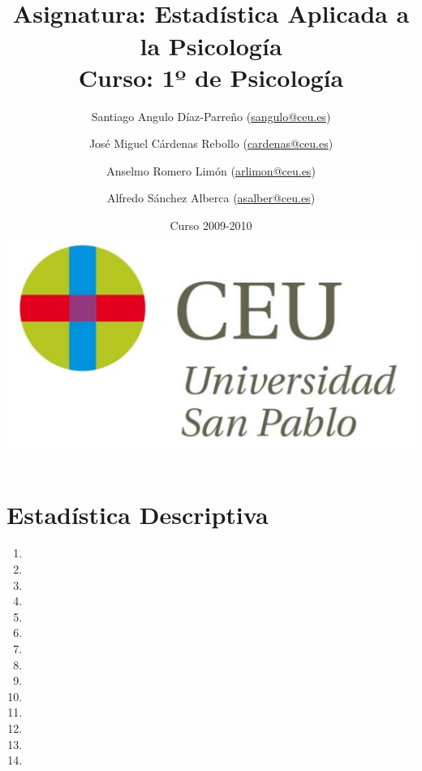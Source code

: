 \documentclass[a4paper,titlepage]{article}
\begin{document}
\sloppy

\title{\vskip 2cm
\shadowbox{\Huge \textbf{\textsf{\quad \textcolor[rgb]{0.00,0.00,0.50}{EJERCICIOS DE ESTADÍSTICA}\quad}}}\\
   \vskip 1cm
   {\Large \textsf{\textcolor[rgb]{0.50,0.00,0.25}{Asignatura: Estadística Aplicada a la Psicología }}}\\
   {\Large \textsf{\textcolor[rgb]{0.50,0.00,0.25}{Curso: 1º de Psicología}}}
   }
\author{
   Santiago Angulo Díaz-Parreño (\url{sangulo@ceu.es})
   \and
   José Miguel Cárdenas Rebollo (\url{cardenas@ceu.es})
   \and
   Anselmo Romero Limón (\url{arlimon@ceu.es})
   \and
   Alfredo Sánchez Alberca (\url{asalber@ceu.es})
}
\date{Curso 2009-2010\\[1cm]
\includegraphics[scale=0.3]{img/logo_uspceu_01}}

\maketitle
\newpage
\tableofcontents
\newpage









\section{Estadística Descriptiva}
\begin{enumerate}[leftmargin=*]
\item {}
\item {}
\item {}
\item {}
\item {}
\item {}
\item {}
\item {}
\item {}
\item {}
\item {}
\item {}
\item {}
\item {}
\end{enumerate}
\end{document}
